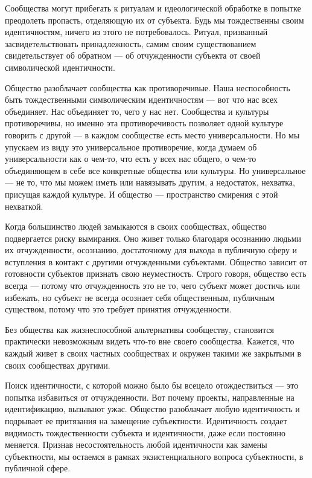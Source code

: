 \documentclass[12pt]{book}
\begin{document}
Сообщества могут прибегать к ритуалам и идеологической обработке в попытке преодолеть пропасть, отделяющую их от субъекта. Будь мы тождественны своим идентичностям, ничего из этого не потребовалось. Ритуал, призванный засвидетельствовать принадлежность, самим своим существованием свидетельствует об обратном --- об отчужденности субъекта от своей символической идентичности.

Общество разоблачает сообщества как противоречивые. Наша неспособность быть тождественными символическим идентичностям --- вот что нас всех объединяет. Нас объединяет то, чего у нас нет. Сообщества и культуры противоречивы, но именно эта противоречивость позволяет одной культуре говорить с другой --- в каждом сообществе есть место универсальности. Но мы упускаем из виду это универсальное противоречие, когда думаем об универсальности как о чем-то, что есть у всех нас общего, о чем-то объединяющем в себе все конкретные общества или культуры. Но универсальное --- не то, что мы можем иметь или навязывать другим, а недостаток, нехватка, присущая каждой культуре. И общество --- пространство смирения с этой нехваткой.

Когда большинство людей замыкаются в своих сообществах, общество подвергается риску вымирания. Оно живет только благодаря осознанию людьми их отчужденности, осознанию, достаточному для выхода в публичную сферу и вступления в контакт с другими отчужденными субъектами. Общество зависит от готовности субъектов признать свою неуместность. Строго говоря, общество есть всегда --- потому что отчужденность это не то, чего субъект может достичь или избежать, но субъект не всегда осознает себя общественным, публичным существом, потому что это требует принятия отчужденности.

Без общества как жизнеспособной альтернативы сообществу, становится практически невозможным видеть что-то вне своего сообщества. Кажется, что каждый живет в своих частных сообществах и окружен такими же закрытыми в своих сообществах другими.

Поиск идентичности, с которой можно было бы всецело отождествиться --- это попытка избавиться от отчужденности. Вот почему проекты, направленные на идентификацию, вызывают ужас. Общество разоблачает любую идентичность и подрывает ее притязания на замещение субъектности. Идентичность создает видимость тождественности субъекта и идентичности, даже если постоянно меняется. Признав несостоятельность любой идентичности как замены субъектности, мы остаемся в рамках экзистенциального вопроса субъектности, в публичной сфере.
\end{document}
